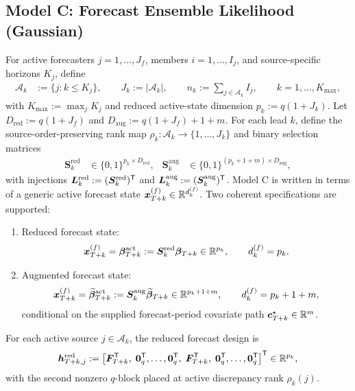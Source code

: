 \subsection{Model C: Forecast Ensemble Likelihood (Gaussian)}
For active forecasters $j=1,\dots,J_f$, members $i=1,\dots,I_j$, and
source-specific horizons $K_j$, define
\begin{align}
\mathcal A_k &:= \{j: k\le K_j\}, \qquad
J_k := |\mathcal A_k|, \qquad
n_k := \sum_{j\in\mathcal A_k} I_j, \qquad k=1,\dots,K_{\max},
\end{align}
with $K_{\max}:=\max_j K_j$ and reduced active-state dimension $p_k:=q(1+J_k)$.
Let $D_{\mathrm{red}}:=q(1+J_f)$ and $D_{\mathrm{aug}}:=q(1+J_f)+1+m$.
For each lead $k$, define the source-order-preserving rank map
$\rho_k:\mathcal A_k\to\{1,\dots,J_k\}$ and binary selection matrices
\begin{align}
\bm S_k^{\mathrm{red}} &\in \{0,1\}^{p_k\times D_{\mathrm{red}}}, &
\bm S_k^{\mathrm{aug}} &\in \{0,1\}^{(p_k+1+m)\times D_{\mathrm{aug}}},
\end{align}
with injections $\bm L_k^{\mathrm{red}}:=(\bm S_k^{\mathrm{red}})^{\mathsf{T}}$ and
$\bm L_k^{\mathrm{aug}}:=(\bm S_k^{\mathrm{aug}})^{\mathsf{T}}$.
Model C is written in terms of a generic active forecast state
$\bm x_{T+k}^{(f)}\in\mathbb{R}^{d_k^{(f)}}$.
Two coherent specifications are supported:
\begin{enumerate}
\item Reduced forecast state:
\begin{align}
\bm x_{T+k}^{(f)}=\bm\beta_{T+k}^{\mathrm{act}}
:=\bm S_k^{\mathrm{red}}\bm\beta_{T+k}\in\mathbb{R}^{p_k},
\qquad d_k^{(f)}=p_k.
\end{align}
\item Augmented forecast state:
\begin{align}
\bm x_{T+k}^{(f)}=\widetilde{\bm\beta}_{T+k}^{\mathrm{act}}
:=\bm S_k^{\mathrm{aug}}\widetilde{\bm\beta}_{T+k}\in\mathbb{R}^{p_k+1+m},
\qquad d_k^{(f)}=p_k+1+m,
\end{align}
conditional on the supplied forecast-period covariate path
$\bm c_{T+k}^\star\in\mathbb{R}^m$.
\end{enumerate}
For each active source $j\in\mathcal A_k$, the reduced forecast design is
\begin{align}
\bm h_{T+k,j}^{\mathrm{red}}
:=
\left[
\bm F_{T+k}^{\mathsf{T}},\;
\bm 0_q^{\mathsf{T}},\dots,\bm 0_q^{\mathsf{T}},\;
\bm F_{T+k}^{\mathsf{T}},\;
\bm 0_q^{\mathsf{T}},\dots,\bm 0_q^{\mathsf{T}}
\right]^{\mathsf{T}} \in \mathbb{R}^{p_k},
\label{eq:C_h_red}
\end{align}
with the second nonzero $q$-block placed at active discrepancy rank $\rho_k(j)$.
